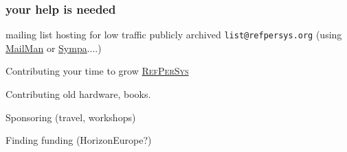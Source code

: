 \documentclass[xcolor=svgnames,final,smaller,a4]{beamer}
\newcommand{\RefPerSys}{\href{http://refpersys.org}{\textsc{RefPerSys}}}
\begin{document}
  
  \begin{frame}
    \frametitle{your help is needed}

    \medskip

    mailing list hosting for low traffic publicly archived
    \texttt{list@refpersys.org} (using
    \href{http://list.org/}{MailMan} or
    \href{https://www.sympa.org/}{Sympa}....)
    \medskip
    
    Contributing your time to grow \RefPerSys

    \medskip
    
    Contributing old hardware, books.

    \medskip
    
    Sponsoring (travel, workshops)

    \medskip

    Finding funding (HorizonEurope?)
    
  \end{frame}
  
\end{document}
